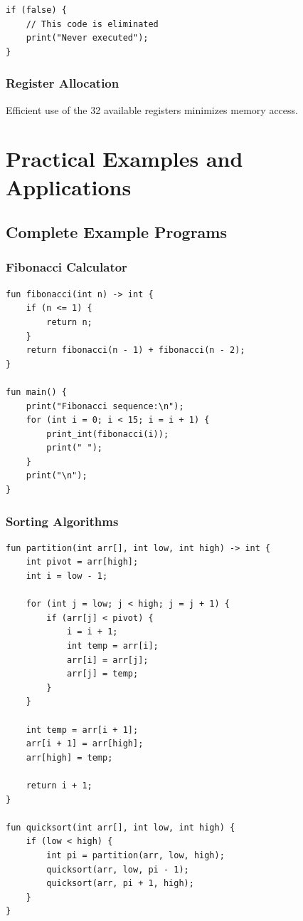 \documentclass[12pt,a4paper,oneside]{book}
\begin{document}
\begin{lstlisting}[style=algo]
if (false) {
    // This code is eliminated
    print("Never executed");
}
\end{lstlisting}

\section{Register Allocation}

Efficient use of the 32 available registers minimizes memory access.

\part{Practical Examples and Applications}

\chapter{Complete Example Programs}

\section{Fibonacci Calculator}

\begin{lstlisting}[style=algo, caption={Fibonacci Program}]
fun fibonacci(int n) -> int {
    if (n <= 1) {
        return n;
    }
    return fibonacci(n - 1) + fibonacci(n - 2);
}

fun main() {
    print("Fibonacci sequence:\n");
    for (int i = 0; i < 15; i = i + 1) {
        print_int(fibonacci(i));
        print(" ");
    }
    print("\n");
}
\end{lstlisting}

\section{Sorting Algorithms}

\begin{lstlisting}[style=algo, caption={Quick Sort}]
fun partition(int arr[], int low, int high) -> int {
    int pivot = arr[high];
    int i = low - 1;
    
    for (int j = low; j < high; j = j + 1) {
        if (arr[j] < pivot) {
            i = i + 1;
            int temp = arr[i];
            arr[i] = arr[j];
            arr[j] = temp;
        }
    }
    
    int temp = arr[i + 1];
    arr[i + 1] = arr[high];
    arr[high] = temp;
    
    return i + 1;
}

fun quicksort(int arr[], int low, int high) {
    if (low < high) {
        int pi = partition(arr, low, high);
        quicksort(arr, low, pi - 1);
        quicksort(arr, pi + 1, high);
    }
}
\end{lstlisting}
\end{document}
